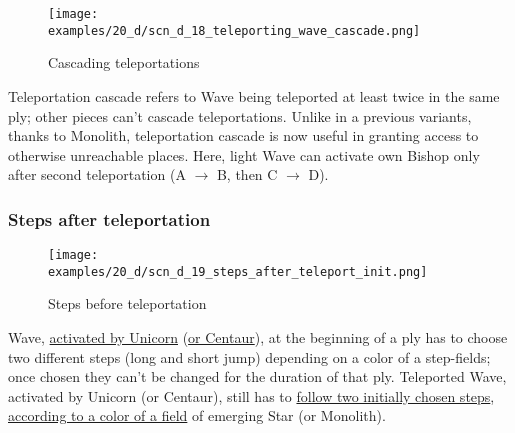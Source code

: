 \vspace*{-1.4\baselineskip}
\noindent
\begin{figure}[!h]
\texttt{[image: examples/20\_d/scn\_d\_18\_teleporting\_wave\_cascade.png]}
\vspace*{-1.3\baselineskip}
\caption{Cascading teleportations}
\label{fig:scn_d_18_teleporting_wave_cascade}
\end{figure}

\vspace*{-0.4\baselineskip}
Teleportation cascade refers to Wave being teleported at least twice in the same ply;
other pieces can't cascade teleportations. Unlike in a previous variants, thanks to
Monolith, teleportation cascade is now useful in granting access to otherwise unreachable
places. Here, light Wave can activate own Bishop only after second teleportation
(A $\rightarrow$ B, then C $\rightarrow$ D).

\clearpage %

\subsubsection*{Steps after teleportation}
\label{sec:Discovery/Monolith/Teleporting/Steps after teleportation}

\vspace*{-1.4\baselineskip}
\noindent
\begin{figure}[!h]
\texttt{[image: examples/20\_d/scn\_d\_19\_steps\_after\_teleport\_init.png]}
\vspace*{-1.3\baselineskip}
\caption{Steps before teleportation}
\label{fig:scn_d_19_steps_after_teleport_init}
\end{figure}

\vspace*{-0.4\baselineskip}
Wave, \hyperref[fig:scn_mv_24_wave_activation_by_unicorn_first_step]{activated by Unicorn}
(\hyperref[fig:scn_hd_07_wave_activation_by_centaur_first_step]{or Centaur}), at the
beginning of a ply has to choose two different steps (long and short jump) depending
on a color of a step-fields; once chosen they can't be changed for the duration of
that ply. Teleported Wave, activated by Unicorn (or Centaur), still has to
\hyperref[fig:scn_n_07_teleport_wave_init]{follow two initially chosen steps},
\hyperref[fig:scn_n_09_teleport_wave_2_init]{according to a color of a field}
of emerging Star (or Monolith).

